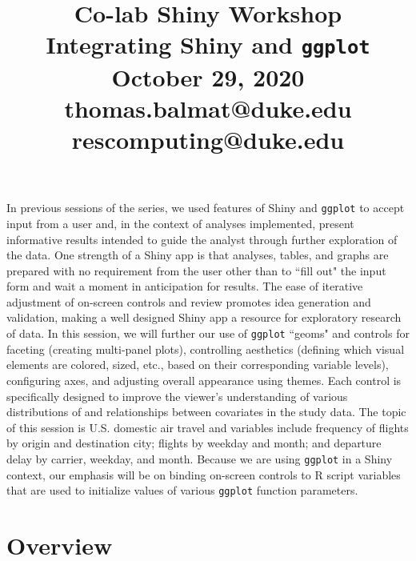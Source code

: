 \documentclass[10pt, letterpaper]{article}
\title{\Large Co-lab Shiny Workshop\\[6pt]
       \large Integrating Shiny and \texttt{ggplot}\\[6pt]
       October 29, 2020\\[20pt]
       \normalsize thomas.balmat@duke.edu\\[1pt]rescomputing@duke.edu}
\date{}
\begin{document}
    
\begin{spacing}{1.0}
    
\maketitle

\vspace{-20pt}


In previous sessions of the series, we used features of Shiny and \texttt{ggplot} to accept input from a user and, in the context of analyses implemented, present informative results intended to guide the analyst through further exploration of the data.  One strength of a Shiny app is that analyses, tables, and graphs are prepared with no requirement from the user other than to ``fill out" the input form and wait a moment in anticipation for results.  The ease of iterative adjustment of on-screen controls and review promotes idea generation and validation, making a well designed Shiny app a resource for exploratory research of data.  In this session, we will further our use of \texttt{ggplot} ``geoms" and controls for faceting (creating multi-panel plots), controlling aesthetics (defining which visual elements are colored, sized, etc., based on their corresponding variable levels), configuring axes, and adjusting overall appearance using themes.  Each control is specifically designed to improve the viewer's understanding of various distributions of and relationships between covariates in the study data.  The topic of this session is U.S. domestic air travel and variables include frequency of flights by origin and destination city; flights by weekday and month; and departure delay by carrier, weekday, and month.  Because we are using \texttt{ggplot} in a Shiny context, our emphasis will be on binding on-screen controls to R script variables that are used to initialize values of various \texttt{ggplot} function parameters.    



\section{Overview}


\end{spacing}
\end{document}
